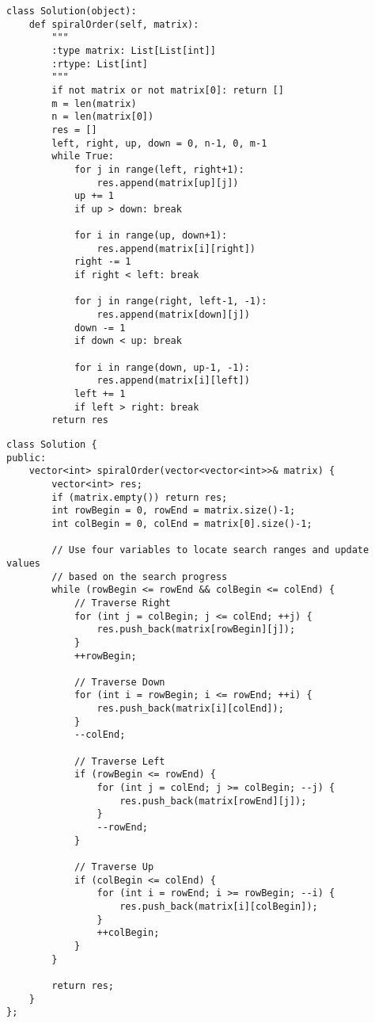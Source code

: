 \begin{lstlisting}
class Solution(object):
    def spiralOrder(self, matrix):
        """
        :type matrix: List[List[int]]
        :rtype: List[int]
        """
        if not matrix or not matrix[0]: return []
        m = len(matrix)
        n = len(matrix[0])
        res = []
        left, right, up, down = 0, n-1, 0, m-1
        while True:
            for j in range(left, right+1):
                res.append(matrix[up][j])
            up += 1
            if up > down: break
                
            for i in range(up, down+1):
                res.append(matrix[i][right])
            right -= 1
            if right < left: break
            
            for j in range(right, left-1, -1):
                res.append(matrix[down][j])
            down -= 1
            if down < up: break
                
            for i in range(down, up-1, -1):
                res.append(matrix[i][left])
            left += 1
            if left > right: break
        return res        
\end{lstlisting}
                

\begin{lstlisting}
class Solution {
public:
    vector<int> spiralOrder(vector<vector<int>>& matrix) {
        vector<int> res;
        if (matrix.empty()) return res;
        int rowBegin = 0, rowEnd = matrix.size()-1;
        int colBegin = 0, colEnd = matrix[0].size()-1;
        
        // Use four variables to locate search ranges and update values 
        // based on the search progress
        while (rowBegin <= rowEnd && colBegin <= colEnd) {
            // Traverse Right
            for (int j = colBegin; j <= colEnd; ++j) {
                res.push_back(matrix[rowBegin][j]);
            }
            ++rowBegin;
            
            // Traverse Down
            for (int i = rowBegin; i <= rowEnd; ++i) {
                res.push_back(matrix[i][colEnd]);
            }
            --colEnd;
            
            // Traverse Left
            if (rowBegin <= rowEnd) {
                for (int j = colEnd; j >= colBegin; --j) {
                    res.push_back(matrix[rowEnd][j]);
                }
                --rowEnd;
            }
            
            // Traverse Up
            if (colBegin <= colEnd) {
                for (int i = rowEnd; i >= rowBegin; --i) {
                    res.push_back(matrix[i][colBegin]);
                }
                ++colBegin;
            }
        }
        
        return res;
    }
};
\end{lstlisting}


